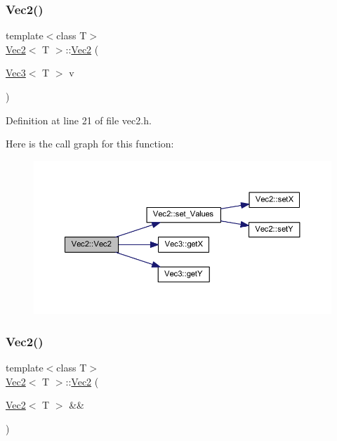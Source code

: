 \subsubsection{\texorpdfstring{Vec2()}{Vec2()}\hspace{0.1cm}{\footnotesize\ttfamily [3/5]}}
{\footnotesize\ttfamily template$<$class T$>$ \\
\mbox{\hyperlink{class_vec2}{Vec2}}$<$ T $>$\+::\mbox{\hyperlink{class_vec2}{Vec2}} (\begin{DoxyParamCaption}\item[{\mbox{\hyperlink{class_vec3}{Vec3}}$<$ T $>$}]{v }\end{DoxyParamCaption})\hspace{0.3cm}{\ttfamily [inline]}}



Definition at line 21 of file vec2.\+h.

Here is the call graph for this function\+:
\nopagebreak
\begin{figure}[H]
\begin{center}
\leavevmode
\includegraphics[width=350pt]{class_vec2_af8b050d3183cdd021678f51f72462726_cgraph}
\end{center}
\end{figure}
\mbox{\label{class_vec2_a2269a937aae8731a9f545dcc81290c28}} 
\subsubsection{\texorpdfstring{Vec2()}{Vec2()}\hspace{0.1cm}{\footnotesize\ttfamily [4/5]}}
{\footnotesize\ttfamily template$<$class T$>$ \\
\mbox{\hyperlink{class_vec2}{Vec2}}$<$ T $>$\+::\mbox{\hyperlink{class_vec2}{Vec2}} (\begin{DoxyParamCaption}\item[{\mbox{\hyperlink{class_vec2}{Vec2}}$<$ T $>$ \&\&}]{ }\end{DoxyParamCaption})\hspace{0.3cm}{\ttfamily [default]}}

